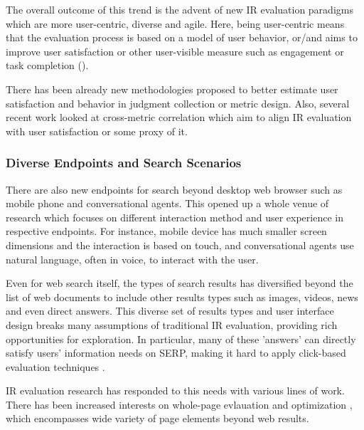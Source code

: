 The overall outcome of this trend is the advent of new IR evaluation paradigms which are more user-centric, diverse and agile. Here, being user-centric means that the evaluation process is based on a model of user behavior, or/and aims to improve user satisfaction or other user-visible measure such as engagement or task completion (\cite{scholer13}). 

There has been already new methodologies proposed to better estimate user satisfaction and behavior in judgment collection \cite{VermaY16, VermaYC16} or metric design\cite{YilmazSCR10, CarteretteKY11, ChapelleMZG09}. Also, several recent work looked at cross-metric correlation \cite{Al-Maskari2007} \cite{radl:comp10} which aim to align IR evaluation with user satisfaction or some proxy of it.


\subsubsection{Diverse Endpoints and Search Scenarios}

There are also new endpoints for search beyond desktop web browser such as mobile phone and conversational agents. This opened up a whole venue of research which focuses on different interaction method and user experience in respective endpoints. For instance, mobile device has much smaller screen dimensions and the interaction is based on touch, and conversational agents use natural language, often in voice, to interact with the user.

Even for web search itself, the types of search results has diversified beyond the list of web documents to include other results types such as images, videos, news and even direct answers. This diverse set of results types and user interface design breaks many assumptions of traditional IR evaluation, providing rich opportunities for exploration. In particular, many of these 'answers' can directly satisfy users' information needs on SERP, making it hard to apply click-based evaluation techniques \cite{Li2009GA} \cite{diriye2012leaving}.

IR evaluation research has responded to this needs with various lines of work. There has been increased\emine{} interests on whole-page evlauation and optimization \cite{Zhou:2012}, which encompasses wide variety of page elements beyond web results. %

